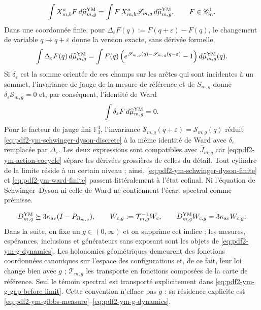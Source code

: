 \begin{equation}\label{eq:pdf2-ym-schwinger-dyson-finite}
 \int X_{m,b}^aF\,d\widehat\mu_{m,g}^{\rm YM}
 =\int F\,X_{m,b}^a\mathscr S_{m,g}\,d\widehat\mu_{m,g}^{\rm YM},
 \qquad F\in\mathscr C_m^1.
\end{equation}
Dans une coordonnée finie, pour $\Delta_\varepsilon F(q):=F(q+\varepsilon)-F(q)$, le changement de variable $q\mapsto q+\varepsilon$ donne la version exacte, sans dérivée formelle,
\begin{equation}\label{eq:pdf2-ym-schwinger-dyson-discrete}
 \int\Delta_\varepsilon F(q)\,d\widehat\mu_{m,g}^{\rm YM}
 =\int F(q)
  \left(e^{\mathscr S_{m,g}(q)-\mathscr S_{m,g}(q-\varepsilon)}-1\right)
  d\widehat\mu_{m,g}^{\rm YM}(q).
\end{equation}
Si $\delta_\varepsilon$ est la somme orientée de ces champs sur les arêtes qui
sont incidentes à un sommet, l’invariance de jauge de la mesure de référence et de
$S_{m,g}$ donne $\delta_\varepsilon\mathscr S_{m,g}=0$ et, par conséquent, l’identité de Ward
\begin{equation}\label{eq:pdf2-ym-ward-finite}
 \int\delta_\varepsilon F\,d\widehat\mu_{m,g}^{\rm YM}=0.
\end{equation}
Pour le facteur de jauge fini $\mathbb F_3^4$, l'invariance $\mathscr S_{m,g}(q+\varepsilon)=\mathscr S_{m,g}(q)$ réduit \eqref{eq:pdf2-ym-schwinger-dyson-discrete} à la même identité de Ward avec $\delta_\varepsilon$ remplacée par $\Delta_\varepsilon$. Les deux expressions sont compatibles avec $\widehat J_{m,g}$ car \eqref{eq:pdf2-ym-action-cocycle} sépare les dérivées grossières de celles du détail. Tout cylindre de la limite réside à un certain niveau ; ainsi, \eqref{eq:pdf2-ym-schwinger-dyson-finite} et \eqref{eq:pdf2-ym-ward-finite} passent littéralement à l'état cofinal. Ni l'équation de Schwinger--Dyson ni celle de Ward ne contiennent l'écart spectral comme prémisse.

\begin{equation}\label{eq:pdf2-ym-g-gap-before-limit}
 D_{m,g}^{\rm YM}\succeq3\kappa_{\rm av}
 (I-P_{\Omega_{m,g}}),
 \qquad
 W_{c,g}:=\mathcal T_{m,g}^{-1}W_c,
 \qquad
 D_{m,g}^{\rm YM}W_{c,g}=3\kappa_{\rm av}W_{c,g}.
\end{equation}
Dans la suite, on fixe un $g\in(0,\infty)$ et on supprime cet indice ; les
mesures, espérances, inclusions et générateurs sans exposant sont les objets
de \eqref{eq:pdf2-ym-g-dynamics}. Les holonomies géométriques demeurent des
fonctions coordonnées canoniques sur l’espace des configurations et, de ce fait, leur
loi change bien avec $g$ ; $\mathcal T_{m,g}$ les transporte en fonctions composées de la
carte de référence. Seul le témoin spectral est transporté explicitement dans
\eqref{eq:pdf2-ym-g-gap-before-limit}. Cette convention n’efface pas $g$ : sa résidence explicite est
\eqref{eq:pdf2-ym-gibbs-measure}--\eqref{eq:pdf2-ym-g-dynamics}.

